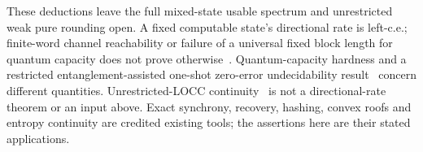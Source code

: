 These deductions leave the full mixed-state usable spectrum and unrestricted weak pure rounding open. A fixed computable state's directional rate is left-c.e.; finite-word channel reachability or failure of a universal fixed block length for quantum capacity does not prove otherwise~\cite{WCPG12,Cubitt15}. Quantum-capacity hardness and a restricted entanglement-assisted one-shot zero-error undecidability result~\cite[Theorems~1.1--1.2]{BMZ26} concern different quantities. Unrestricted-LOCC continuity~\cite[Theorem~1.2]{SS26} is not a directional-rate theorem or an input above. Exact synchrony, recovery, hashing, convex roofs and entropy continuity are credited existing tools; the assertions here are their stated applications.
